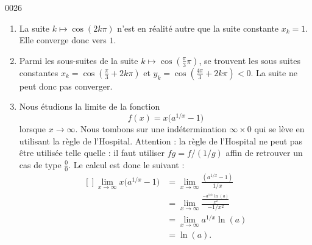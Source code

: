 
\begin{corrige}{0026}

\begin{enumerate}
\item La suite $k\mapsto \cos(2k\pi)$ n'est en réalité autre que la suite constante $x_k=1$. Elle converge donc vers $1$.
\item Parmi les sous-suites de la suite $k\mapsto\cos(\frac{ \pi }{ 3 }\pi)$, se trouvent les sous suites constantes $x_k=\cos(\frac{ \pi }{ 3 }+2k\pi)$ et $y_k=\cos(\frac{ 4\pi }{ 3 }+2k\pi)<0$. La suite ne peut donc pas converger.
\item Nous étudions la limite de la fonction
\begin{equation}
	f(x)=x\big( a^{1/x}-1 \big)
\end{equation}
lorsque $x\to\infty$. Nous tombons sur une indétermination $\infty\times 0$ qui se lève en utilisant la règle de l'Hospital. Attention : la règle de l'Hospital ne peut pas être utilisée telle quelle : il faut utiliser $fg=f/(1/g)$ affin de retrouver un cas de type $\frac{ 0 }{ 0 }$. Le calcul est donc le suivant :
\begin{equation}
	\begin{aligned}[]
		\lim_{x\to\infty} x\big( a^{1/x}-1 \big)	&=\lim_{x\to\infty}\frac{ (a^{1/x}-1) }{ 1/x }\\
				&=\lim_{x\to\infty}\frac{ \frac{ -a^{1/x}\ln(a) }{ x^2 } }{ -1/x^2 }\\
				&=\lim_{x\to\infty}a^{1/x}\ln(a)\\
				&=\ln(a).
	\end{aligned}
\end{equation}

\end{enumerate}


\end{corrige}
